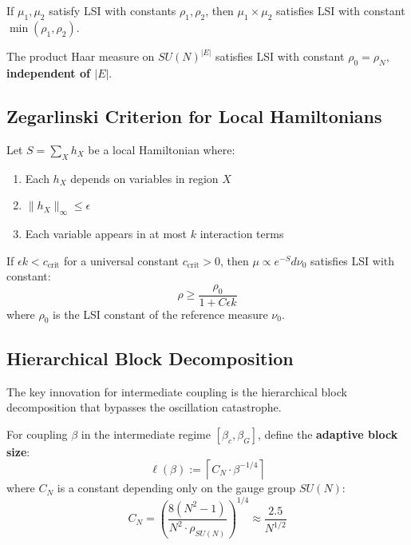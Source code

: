 \begin{theorem}
\label{thm:tensorization}
If $\mu_1, \mu_2$ satisfy LSI with constants $\rho_1, \rho_2$, then 
$\mu_1 \times \mu_2$ satisfies LSI with constant $\min(\rho_1, \rho_2)$.
\end{theorem}

\begin{corollary}
The product Haar measure on $SU(N)^{|E|}$ satisfies LSI with constant 
$\rho_0 = \rho_N$, \textbf{independent of $|E|$}.
\end{corollary}

\subsection{Zegarlinski Criterion for Local Hamiltonians}
\label{sec:hierarchical-lsi-app76_log-sobolev_method_uniform_spectral_gap}

\begin{theorem}
\label{thm:zegarlinski-criterion}
\label{thm:zegarlinski-main}
Let $S = \sum_X h_X$ be a local Hamiltonian where:
\begin{enumerate}
\item Each $h_X$ depends on variables in region $X$
\item $\|h_X\|_\infty \leq \epsilon$
\item Each variable appears in at most $k$ interaction terms
\end{enumerate}
If $\epsilon k < c_{\text{crit}}$ for a universal constant $c_{\text{crit}} > 0$, then 
$\mu \propto e^{-S} d\nu_0$ satisfies LSI with constant:
\[
\rho \geq \frac{\rho_0}{1 + C\epsilon k}
\]
where $\rho_0$ is the LSI constant of the reference measure $\nu_0$.
\end{theorem}

\subsection{Hierarchical Block Decomposition}
\label{subsec:hierarchical-blocks}

The key innovation for intermediate coupling is the hierarchical block decomposition 
that bypasses the oscillation catastrophe.

\begin{definition}
\label{def:adaptive-block}
For coupling $\beta$ in the intermediate regime $[\beta_c, \beta_G]$, define the 
\textbf{adaptive block size}:
\[
\ell(\beta) := \left\lceil C_N \cdot \beta^{-1/4} \right\rceil
\]
where $C_N$ is a constant depending only on the gauge group $SU(N)$:
\[
C_N = \left(\frac{8(N^2-1)}{N^2 \cdot \rho_{SU(N)}}\right)^{1/4} \approx \frac{2.5}{N^{1/2}}
\]
\end{definition}

